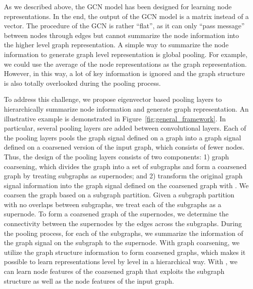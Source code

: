 \documentclass[sigconf]{acmart}
\begin{document}
As we described above, the GCN model has been designed for learning node representations. In the end, the output of the GCN model is a matrix instead of a vector. The procedure of the GCN is rather ``flat'', as it can only ``pass message'' between nodes through edges but cannot summarize the node information into the higher level graph representation. A simple way to summarize the node information to generate graph level representation is global pooling. For example, we could use the average of the node representations as the graph representation. However, in this way, a lot of key information is ignored and the graph structure is also totally overlooked during the pooling process. 

To address this challenge, we propose eigenvector based pooling layers  to hierarchically summarize node information and generate graph representation. An illustrative example is demonstrated in Figure~\ref{fig:general_framework}. In particular, several pooling layers are added between convolutional layers. Each of the pooling layers pools the graph signal defined on a graph into a graph signal defined on a coarsened version of the input graph, which consists of fewer nodes. Thus, the design of the pooling layers consists of two components: 1) graph coarsening, which divides the graph into a set of subgraphs and form a coarsened graph by treating subgraphs as supernodes; and 2) transform the original graph signal information into the graph signal defined on the coarsened graph with . We coarsen the graph based on a subgraph partition. Given a subgraph partition with no overlaps between subgraphs, we treat each of the subgraphs as a supernode. To form a coarsened graph of the supernodes, we determine the connectivity between the supernodes by the edges across the subgraphs. During the pooling process, for each of the subgraphs, we summarize the information of the graph signal on the subgraph to the supernode. With graph coarsening, we utilize the graph structure information to form coarsened graphs, which makes it possible to learn representations level by level in a hierarchical way. With , we can learn node features of the coarsened graph that exploits the subgraph structure as well as the node features of the input graph.
\end{document}
